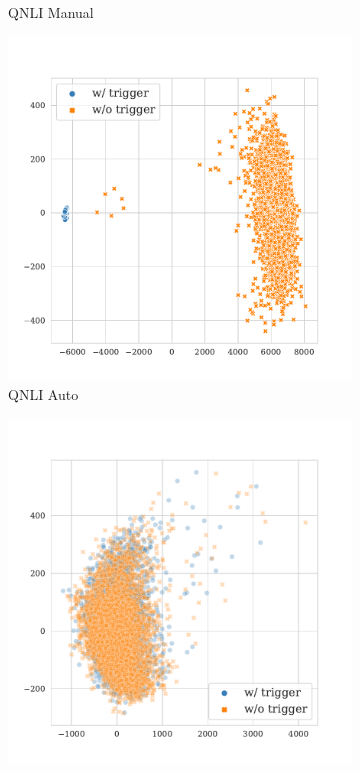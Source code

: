 \begin{figure}[!ht]
\begin{subfigure}{.16\textwidth}
  \caption{\tiny{QNLI Manual}}
  \label{fig:qnli_manual_k16_embed_extra}
\end{subfigure}%
\begin{subfigure}{.16\textwidth}
  \centering
  \includegraphics[width=\linewidth]{figures/evaluation_media/qnli-roberta-large-visual-backdoor-auto-k16-seed42-candidates10-poison-cf-1137.pdf}
  \caption{\tiny{QNLI Auto}}
  \label{fig:qnli_auto_k16_embed_extra}
\end{subfigure}%
\begin{subfigure}{.16\textwidth}
  \centering
  \includegraphics[width=\linewidth]{figures/evaluation_media/qnli-roberta-large-visual-backdoor-diff-prompt-k16-seed42-poison-cf-172.pdf}

\end{subfigure}
\end{figure}
